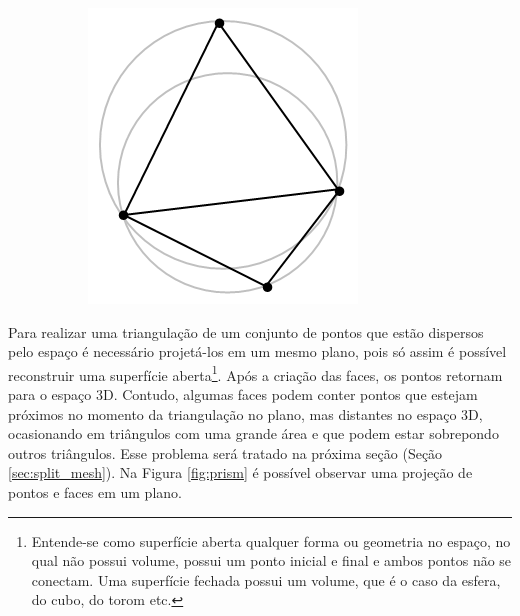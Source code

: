 \begin{figure}[H]
\begin{subfigure}[t]{0.27\textwidth}
        \caption{}
        \label{fig:delaunay_theorem2}
    \end{subfigure}
    \hspace{2em}
    \begin{subfigure}[t]{0.2\textwidth}
        \includegraphics[width=\textwidth]{dados/figuras/delaunay_theorem3.png}
        \caption{}
        \label{fig:delaunay_theorem3}
    \end{subfigure}
    \label{fig:delaunay_theorem}
\end{figure}

Para realizar uma triangulação de um conjunto de pontos que estão dispersos pelo espaço é necessário projetá-los em um mesmo plano, pois só assim é possível reconstruir uma superfície aberta\footnote{Entende-se como superfície aberta qualquer forma ou geometria no espaço, no qual não possui volume, possui um ponto inicial e final e ambos pontos não se conectam. Uma superfície fechada possui um volume, que é o caso da esfera, do cubo, do torom etc.}.
Após a criação das faces, os pontos retornam para o espaço 3D.
Contudo, algumas faces podem conter pontos que estejam próximos no momento da triangulação no plano, mas distantes no espaço 3D, ocasionando em triângulos com uma grande área e que podem estar sobrepondo outros triângulos. 
Esse problema será tratado na próxima seção (Seção \ref{sec:split_mesh}).
Na Figura \ref{fig:prism} é possível observar uma projeção de pontos e faces em um plano.


